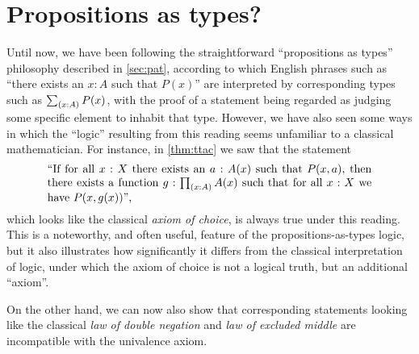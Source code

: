 %
%

\section{Propositions as types?}
\label{subsec:pat?}

%
%
%
Until now, we have been following the straightforward ``propositions as types'' philosophy described in \autoref{sec:pat}, according to which English phrases such as ``there exists an $x:A$ such that $P(x)$'' are interpreted by corresponding types such as $\sm{x:A} P(x)$, with the proof of a statement being regarded as judging some specific element to inhabit that type.
However, we have also seen some ways in which the ``logic'' resulting from this reading seems unfamiliar to a classical mathematician.
For instance, in \autoref{thm:ttac} we saw that the statement
%
\begin{equation}\label{eq:english-ac}
  \parbox{\textwidth-2cm}{``If for all $x:X$ there exists an $a:A(x)$ such that $P(x,a)$, then there exists a function $g:\prd{x:A} A(x)$ such that for all $x:X$ we have $P(x,g(x))$'',}
\end{equation}
which looks like the classical \emph{axiom of choice}, is always true under this reading. This is a noteworthy, and often useful, feature of the propositions-as-types logic, but it also illustrates how significantly it differs from the classical interpretation of logic, under which the axiom of choice is not a logical truth, but an additional ``axiom''.

On the other hand, we can now also show that corresponding statements looking like the classical \emph{law of double negation} and \emph{law of excluded middle} are incompatible with the univalence axiom.
%

